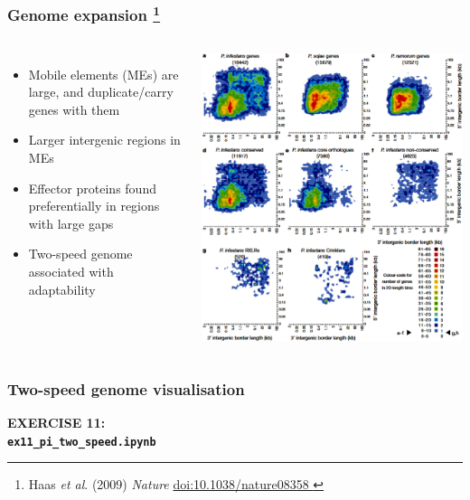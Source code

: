 %
\begin{frame}
  \frametitle{Genome expansion
    \footnote{\tiny{Haas \textit{et al}. (2009) \textit{Nature} \href{http://dx.doi.org/10.1038/nature08358
}{doi:10.1038/nature08358
  }}}
}
  \begin{columns}[T] 
      \begin{itemize}
        \item Mobile elements (MEs) are large, and duplicate/carry genes with them
        \item \textcolor{hutton_green}{Larger intergenic regions in MEs}
        \item \textcolor{hutton_blue}{Effector proteins found preferentially in regions with large gaps}
        \item \textcolor{hutton_purple}{Two-speed genome associated with adaptability}
      \end{itemize}  
        \includegraphics[width=\textwidth]{images/pi_two_speed}
    \end{columns}
\end{frame}

%
\begin{frame}
  \frametitle{Two-speed genome visualisation}
  \Large{
    \textcolor{hutton_blue}{
      \textbf{
      EXERCISE 11: \\
      \texttt{ex11\_pi\_two\_speed.ipynb}
      }
    }
  }
\end{frame}